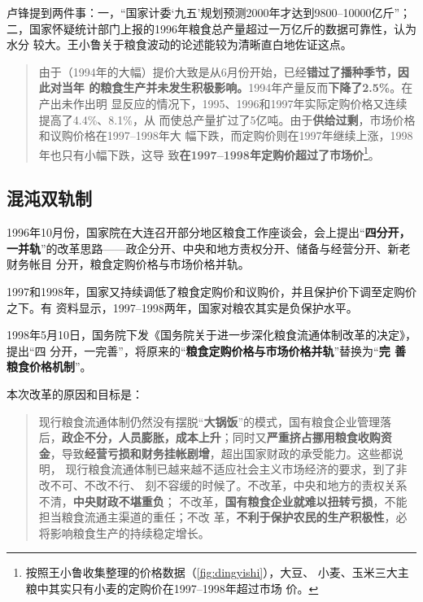 卢锋提到两件事：一，“国家计委‘九五’规划预测2000年才达到9800--10000亿斤”；
二，国家怀疑统计部门上报的1996年粮食总产量超过一万亿斤的数据可靠性，认为水分
较大。王小鲁关于粮食波动的论述能较为清晰直白地佐证这点。
\begin{quotation}
  由于（1994年的大幅）提价大致是从6月份开始，已经\textbf{错过了播种季节，因此对当年
    的粮食生产并未发生积极影响。}1994年产量反而\textbf{下降了2.5\%}。在产出未作出明
  显反应的情况下，1995、1996和1997年实际定购价格又连续提高了4.4\%、8.1\%，从
  而使总产量扩过了5亿吨。由于\textbf{供给过剩}，市场价格和议购价格在1997--1998年大
  幅下跌，而定购价则在1997年继续上涨，1998年也只有小幅下跌，这导
  致\textbf{在1997--1998年定购价超过了市场价}\footnote{按照王小鲁收集整理的价格数据（\cref{fig:dingyishi}），大豆、
    小麦、玉米三大主粮中其实只有小麦的定购价在1997--1998年超过市场
    价。}。\cite{wangxiaoluliangshi}
\end{quotation}


\subsection{混沌双轨制}

1996年10月份，国家院在大连召开部分地区粮食工作座谈会，会上提出“\textbf{四分开，
  一并轨}”的改革思路——政企分开、中央和地方责权分开、储备与经营分开、新老财务帐目
分开，粮食定购价格与市场价格并轨。

1997和1998年，国家又持续调低了粮食定购价和议购价，并且保护价下调至定购价之下。有
资料显示，1997--1998两年，国家对粮农其实是负保护水平。

1998年5月10日，国务院下发《国务院关于进一步深化粮食流通体制改革的决定》，提出“四
分开，一完善”，将原来的“\textbf{粮食定购价格与市场价格并轨}”替换为“\textbf{完
  善粮食价格机制}”。

本次改革的原因和目标是：
\begin{quotation}
  现行粮食流通体制仍然没有摆脱“\textbf{大锅饭}”的模式，国有粮食企业管理落
  后，\textbf{政企不分，人员膨胀，成本上升}；同时又\textbf{严重挤占挪用粮食收购资
    金}，导致\textbf{经营亏损和财务挂帐剧增}，超出国家财政的承受能力。这些都说明，
  现行粮食流通体制已越来越不适应社会主义市场经济的要求，到了非改不可、不改不行、
  刻不容缓的时候了。不改革，中央和地方的责权关系不清，\textbf{中央财政不堪重负}；
  不改革，\textbf{国有粮食企业就难以扭转亏损}，不能担当粮食流通主渠道的重任；不改
  革，\textbf{不利于保护农民的生产积极性}，必将影响粮食生产的持续稳定增长。
\end{quotation}


